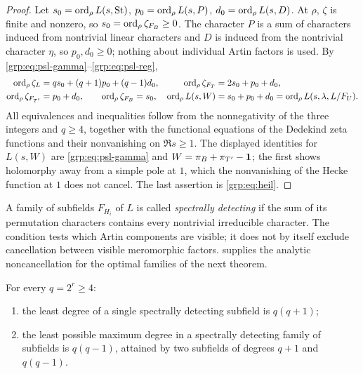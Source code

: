 \begin{proof}
Let $s_0=\operatorname{ord}_\rho L(s,\mathrm{St})$, $p_0=\operatorname{ord}_\rho L(s,P)$,
$d_0=\operatorname{ord}_\rho L(s,D)$. At $\rho$, $\zeta$ is finite and nonzero, so
$s_0=\operatorname{ord}_\rho\zeta_{F_B}\ge0$. The character $P$ is a sum of characters
induced from nontrivial linear characters and $D$ is induced from the
nontrivial character $\eta$, so $p_0,d_0\ge0$; nothing about individual Artin
factors is used. By \eqref{grp:eq:psl-gamma}--\eqref{grp:eq:psl-reg},
\begin{align*}
 \operatorname{ord}_\rho\zeta_L&=qs_0+(q+1)p_0+(q-1)d_0, &
 \operatorname{ord}_\rho\zeta_{F_T}&=2s_0+p_0+d_0,\\
 \operatorname{ord}_\rho\zeta_{F_{T'}}&=p_0+d_0,\qquad\operatorname{ord}_\rho\zeta_{F_B}=s_0, &
 \operatorname{ord}_\rho L(s,W)&=s_0+p_0+d_0=\operatorname{ord}_\rho L(s,\lambda,L/F_U).
\end{align*}
All equivalences and inequalities follow from the nonnegativity of the three
integers and $q\ge4$, together with the functional equations of the Dedekind
zeta functions and their nonvanishing on $\Re s\ge1$. The displayed identities
for $L(s,W)$ are \eqref{grp:eq:psl-gamma} and $W=\pi_B+\pi_{T'}-\mathbf{1}$; the
first shows holomorphy away from a simple pole at $1$, which the nonvanishing
of the Hecke function at $1$ does not cancel. The last assertion is
\eqref{grp:eq:heil}.
\end{proof}

A family of subfields $F_{H_i}$ of $L$ is called \emph{spectrally detecting}
if the sum of its permutation characters contains every nontrivial irreducible
character. The condition tests which Artin components are visible; it does not
by itself exclude cancellation between visible meromorphic factors.
 supplies the analytic noncancellation for the
optimal families of the next theorem.

\begin{theorem}\label{grp:thm:psl-optimal}
For every $q=2^r\ge4$:
\begin{enumerate}[label=\textup{(\alph*)}]
\item the least degree of a single spectrally detecting subfield is $q(q+1)$;
\item the least possible maximum degree in a spectrally detecting family of
subfields is $q(q-1)$, attained by two subfields of degrees $q+1$ and
$q(q-1)$.
\end{enumerate}
\end{theorem}

